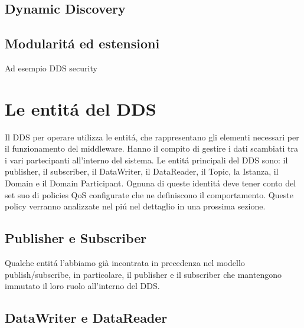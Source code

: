 \subsection{Dynamic Discovery}


\subsection{Modularitá ed estensioni}
Ad esempio DDS security







\section{Le entitá del DDS}
Il DDS per operare utilizza le entitá, che rappresentano gli elementi necessari
per il funzionamento del middleware. Hanno il compito di gestire i dati
scambiati tra i vari partecipanti all'interno del sistema. 
Le entitá principali del DDS sono: 
il publisher, il subscriber, il DataWriter, il DataReader, il Topic,
la Istanza, il Domain e il Domain Participant.
Ognuna di queste identitá deve tener conto del set suo di policies QoS configurate
che ne definiscono il comportamento. Queste policy verranno analizzate 
nel piú nel dettaglio in una prossima sezione.

\subsection{Publisher e Subscriber}

Qualche entitá l'abbiamo già incontrata
in precedenza nel modello publish/subscribe, in particolare, il publisher e 
il subscriber che mantengono immutato il loro ruolo all'interno del DDS.

\subsection{DataWriter e DataReader}

